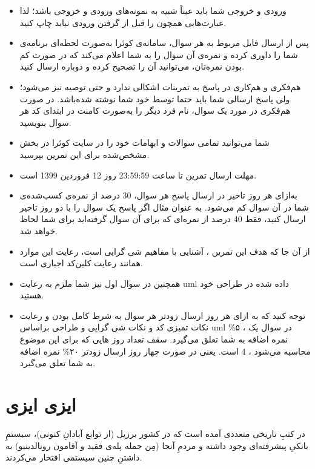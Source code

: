 \documentclass[]{article}
\begin{document}
\begin{itemize}[label=$\ast$]
\item ورودی و خروجی شما باید عیناً شبیه به نمونه‌های ورودی و خروجی باشد؛ لذا عبارت‌هایی همچون  را قبل از گرفتن ورودی نباید چاپ کنید.
\item پس از ارسال فایل مربوط به هر سوال، سامانه‌ی کوئرا به‌صورت لحظه‌ای برنامه‌ی شما را داوری کرده و نمره‌ی آن سوال را به شما اعلام می‌کند که در صورت کم بودن نمره‌تان، می‌توانید آن را تصحیح کرده و دوباره ارسال کنید.
\item هم‌فکری و هم‌کاری در پاسخ به تمرینات اشکالی ندارد و حتی توصیه نیز می‌شود؛ ولی پاسخ ارسالی شما باید حتما توسط خود شما نوشته شده‌باشد. در صورت هم‌فکری در مورد یک سوال، نام فرد دیگر را به‌صورت کامنت در ابتدای کد هر سوال بنویسید.
\item شما می‌توانید تمامی سوالات و ابهامات خود را در سایت کوئرا در بخش مشخص‌شده برای این تمرین بپرسید.
\item مهلت ارسال تمرین تا ساعت 23:59:59 روز 12 فروردین 1399 است.
\item به‌ازای هر روز تاخیر در ارسال پاسخ هر سوال، 30 درصد از نمره‌ی کسب‌شده‌ی شما در آن سوال کم می‌شود. به عنوان مثال اگر پاسخ یک سوال را با دو روز تاخیر ارسال کنید، فقط 40 درصد از نمره‌ای که برای آن سوال گرفته‌اید برای شما لحاظ خواهد شد.

\item
از آن جا که هدف این تمرین ، آشنایی با مفاهیم شی گرایی است، رعایت این موارد همانند رعایت ‌کلین‌کد اجباری است.

\item
همچنین در سوال اول نیز شما ملزم به رعایت uml داده شده در طراحی خود هستید.

\item

توجه کنید که به ازای هر روز ارسال زودتر هر سوال به شرط کامل بودن و رعایت نکات تمیزی کد و نکات شی گرایی و طراحی براساس uml در سوال یک ، ۵\% نمره اضافه به شما تعلق می‌گیرد. سقف تعداد روز هایی که برای این موضوع محاسبه می‌شود ، 4 است. یعنی در صورت  چهار روز  ارسال زودتر  ۲۰\% نمره اضافه به شما تعلق می‌گیرد.
\end{itemize}




\newpage
\section{ایزی ایزی}
در کتبِ تاریخی متعددی آمده است که در کشور برزیل (از توابع آبادانِ کنونی)، سیستمِ بانکیِ پیشرفته‌ای وجود داشته و مردمِ آنجا (مِن جمله پله‌ی فقید و آقامون رونالدینیو) به داشتنِ چنین سیستمی افتخار می‌کردند.
\end{document}
